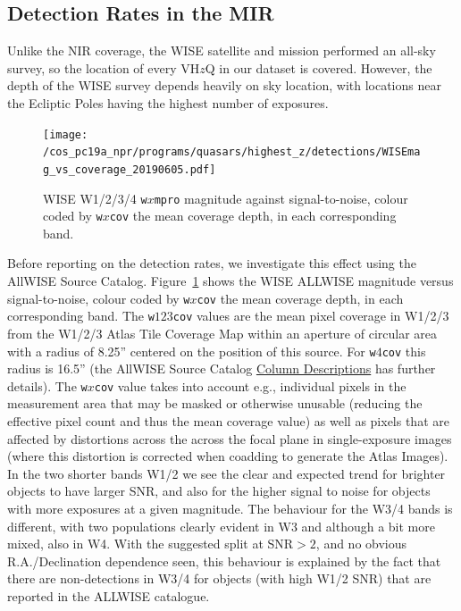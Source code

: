 \documentclass[usenatbib]{mnras}
\begin{document}
\subsection{Detection Rates in the MIR}
Unlike the NIR coverage, the WISE satellite and mission performed an all-sky survey, so the location of every VH$z$Q in our dataset is covered. However, the depth of the WISE survey depends heavily on sky location, with locations near the Ecliptic Poles having the highest number of exposures.

\begin{figure}
  \texttt{[image: /cos\_pc19a\_npr/programs/quasars/highest\_z/detections/WISEmag\_vs\_coverage\_20190605.pdf]}
  \centering
  \vspace{-14pt}
  \caption[]{WISE W1/2/3/4 {\tt w$x$mpro} magnitude against signal-to-noise,
    colour coded by {\tt w$x$cov} the mean coverage depth, in each corresponding band.}
  \label{fig:WISEmag_vs_coverage}
\end{figure}
Before reporting on the detection rates, we investigate this effect
using the AllWISE Source Catalog. Figure~\ref{fig:WISEmag_vs_coverage}
shows the WISE ALLWISE magnitude versus signal-to-noise, colour coded
by {\tt w$x$cov} the mean coverage depth, in each corresponding
band. The {\tt w$123$cov} values are the mean pixel coverage in W1/2/3
from the W1/2/3 Atlas Tile Coverage Map within an aperture of circular
area with a radius of 8.25'' centered on the position of this
source. For {\tt w$4$cov} this radius is 16.5'' (the AllWISE Source
Catalog
\href{http://wise2.ipac.caltech.edu/docs/release/allwise/expsup/sec2_1a.html#w2cov}{Column
Descriptions} has further details). The {\tt w$x$cov} value takes into
account e.g., individual pixels in the measurement area that may be
masked or otherwise unusable (reducing the effective pixel count and
thus the mean coverage value) as well as pixels that are affected by
distortions across the across the focal plane in single-exposure
images (where this distortion is corrected when coadding to generate
the Atlas Images). 
In the two shorter bands W1/2 we see the clear and expected
trend for brighter objects to have larger SNR, and also for the higher
signal to noise for objects with more exposures at a given
magnitude. The behaviour for the W3/4 bands is different, with two
populations clearly evident in W3 and although a bit more mixed, also
in W4. With the suggested split at SNR$>2$, and no obvious
R.A./Declination dependence seen, this behaviour is explained by the
fact that there are non-detections in W3/4 for objects (with high W1/2
SNR) that are reported in the ALLWISE catalogue.
\end{document}

